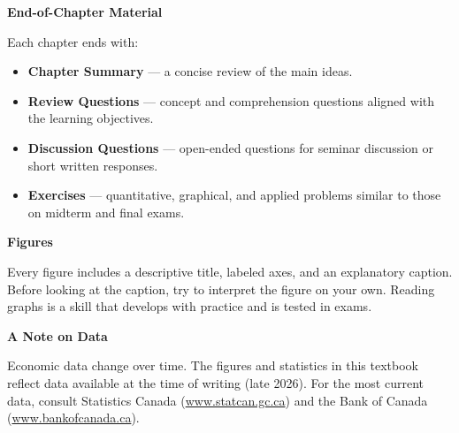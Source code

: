 \documentclass[12pt,twoside,openright]{book}
\theoremstyle{definition}
\begin{document}
\vspace{10pt}
\noindent\textbf{End-of-Chapter Material}

Each chapter ends with:
\begin{itemize}
  \item \textbf{Chapter Summary} --- a concise review of the main ideas.
  \item \textbf{Review Questions} --- concept and comprehension questions aligned with the
        learning objectives.
  \item \textbf{Discussion Questions} --- open-ended questions for seminar discussion or
        short written responses.
  \item \textbf{Exercises} --- quantitative, graphical, and applied problems similar to
        those on midterm and final exams.
\end{itemize}

\vspace{10pt}
\noindent\textbf{Figures}

Every figure includes a descriptive title, labeled axes, and an explanatory caption. Before
looking at the caption, try to interpret the figure on your own. Reading graphs is a skill
that develops with practice and is tested in exams.

\vspace{10pt}
\noindent\textbf{A Note on Data}

Economic data change over time. The figures and statistics in this textbook reflect data
available at the time of writing (late 2026). For the most current data, consult
Statistics Canada (\url{www.statcan.gc.ca}) and the Bank of Canada
(\url{www.bankofcanada.ca}).

\tableofcontents
\listoffigures
\listoftables

\mainmatter
\pagestyle{fancy}












\backmatter
\pagestyle{fancy}




\end{document}
